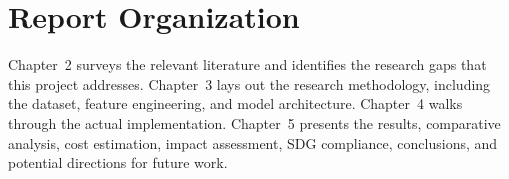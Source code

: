 \section{Report Organization}

Chapter~2 surveys the relevant literature and identifies the research gaps that this project addresses. Chapter~3 lays out the research methodology, including the dataset, feature engineering, and model architecture. Chapter~4 walks through the actual implementation. Chapter~5 presents the results, comparative analysis, cost estimation, impact assessment, SDG compliance, conclusions, and potential directions for future work.
